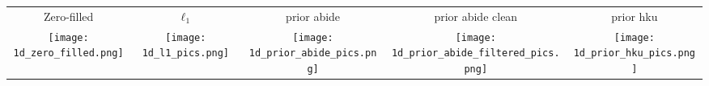 
\begin{tabular}{c @{\hskip 0pt} c @{\hskip 0pt} c @{\hskip 0pt} c @{\hskip 0pt} c }
    Zero-filled& $\ell_1$ & prior abide & prior abide clean & prior hku \\
    \texttt{[image: 1d\_zero\_filled.png]}&
    \texttt{[image: 1d\_l1\_pics.png]}&
    \texttt{[image: 1d\_prior\_abide\_pics.png]}&
    \texttt{[image: 1d\_prior\_abide\_filtered\_pics.png]}&
    \texttt{[image: 1d\_prior\_hku\_pics.png]}
   \end{tabular}